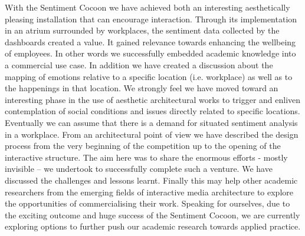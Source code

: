 With the Sentiment Cocoon we have achieved both an interesting aesthetically pleasing installation that can encourage interaction. Through its implementation in an atrium surrounded by workplaces, the sentiment data collected by the dashboards created a value. It gained relevance towards enhancing the wellbeing of employees. In other words we successfully embedded academic knowledge into a commercial use case. In addition we have created a discussion about the mapping of emotions relative to a specific location (i.e. workplace) as well as to the happenings in that location. We strongly feel we have moved toward an interesting phase in the use of aesthetic architectural works to trigger and enliven contemplation of social conditions and issues directly related to specific locations. Eventually we can assume that there is a demand for situated sentiment analysis in a workplace.
From an architectural point of view we have described the design process from the very beginning of the competition up to the opening of the interactive structure. The aim here was to share the enormous efforts - mostly invisible – we undertook to successfully complete such a venture. We have discussed the challenges and lessons learnt. Finally this may help other academic researchers from the emerging fields of interactive media architecture to explore the opportunities of commercialising their work.
Speaking for ourselves, due to the exciting outcome and huge success of the Sentiment Cocoon, we are currently exploring options to further push our academic research towards applied practice.







